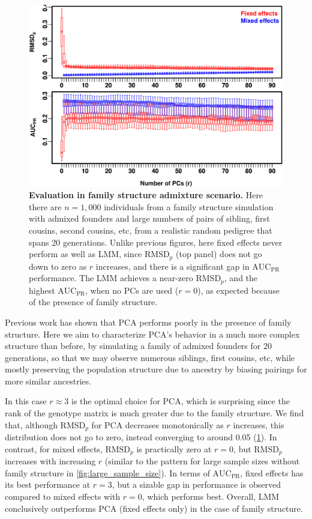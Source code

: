 \documentclass[11pt]{article}
\newcommand{\rmsd}{\text{RMSD}_p}
\newcommand{\auc}{\text{AUC}_\text{PR}}
\begin{document}
\begin{figure}[bp!]
  \centering
  \includegraphics[width=6in]{boxplot_n_1000_family.pdf}
  \caption{
    {\bf Evaluation in family structure admixture scenario.}
    Here there are $n = 1,000$ individuals from a family structure simulation with admixed founders and large numbers of pairs of sibling, first cousins, second cousins, etc, from a realistic random pedigree that spans 20 generations.
    Unlike previous figures, here fixed effects never perform as well as LMM, since $\rmsd$ (top panel) does not go down to zero as $r$ increases, and there is a significant gap in $\auc$ performance.
    The LMM achieves a near-zero $\rmsd$, and the highest $\auc$, when no PCs are used ($r=0$), as expected because of the presence of family structure.
  }
  \label{fig:family_structure}
\end{figure}

Previous work has shown that PCA performs poorly in the presence of family structure.
Here we aim to characterize PCA's behavior in a much more complex structure than before, by simulating a family of admixed founders for 20 generations, so that we may observe numerous siblings, first cousins, etc, while mostly preserving the population structure due to ancestry by biasing pairings for more similar ancestries.

In this case $r \approx 3$ is the optimal choice for PCA, which is surprising since the rank of the genotype matrix is much greater due to the family structure.
We find that, although $\rmsd$ for PCA decreases monotonically as $r$ increases, this distribution does not go to zero, instead converging to around 0.05 (\cref{fig:family_structure}).
In contrast, for mixed effects, $\rmsd$ is practically zero at $r=0$, but $\rmsd$ increases with increasing $r$ (similar to the pattern for large sample sizes without family structure in \cref{fig:large_sample_size}).
In terms of $\auc$, fixed effects has its best performance at $r=3$, but a sizable gap in performance is observed compared to mixed effects with $r = 0$, which performs best.
Overall, LMM conclusively outperforms PCA (fixed effects only) in the case of family structure. 
\end{document}
